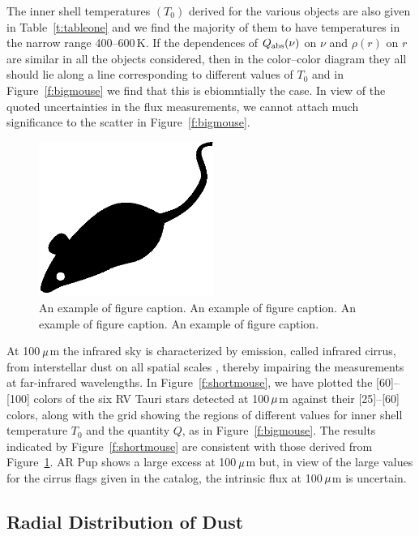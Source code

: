 \documentclass[useAMS,usenatbib]{biom}
\begin{document}
The inner shell temperatures $(T_0)$ derived for the various objects
are also given in Table~\ref{t:tableone} and we find the majority
of them to have temperatures in the narrow range
400--600$\,$K. If the dependences of $Q_{{\mathrm{abs}}}(\nu)$ on $\nu$ and
$\rho(r)$ on $r$ are similar in all the objects considered, then in
the color--color diagram they all should lie along a line
corresponding to different values of $T_0$ and in
Figure~\ref{f:bigmouse} we find that this is ebiomntially the case. In
view of the quoted uncertainties in the flux measurements, we cannot
attach much significance to the scatter in Figure~\ref{f:bigmouse}.

\begin{figure}
 \centerline{\includegraphics[width=2.25in]{mouse.eps}}
\caption{An example of figure caption. An example of figure
caption. An example of figure caption. An example of figure
caption.}
\label{f:mouse1column}
\end{figure}


At \hbox{100\,$\mu$m} the infrared sky is characterized by emission,
called infrared cirrus, from interstellar dust on all spatial scales
\citep{b16}, thereby impairing the measurements at far-infrared
wavelengths. \eqnbreaktop{3pc} In Figure~\ref{f:shortmouse}, we have plotted the
[60]--[100] colors of the six RV Tauri stars detected at
\hbox{100\,$\mu$m} against their [25]--[60] colors, along with the
grid showing the regions of different values for inner shell
temperature $T_0$ and the quantity $Q$, as in Figure~\ref{f:bigmouse}.
The results indicated by Figure~\ref{f:shortmouse} are consistent with
those derived from Figure~\ref{f:mouse1column}.  AR Pup shows a large
excess at \hbox{100\,$\mu$m} but, in view of the large values for the
cirrus flags given in the catalog, the intrinsic flux at
\hbox{100\,$\mu$m} is uncertain.


\subsection{Radial Distribution of Dust}
\end{document}
